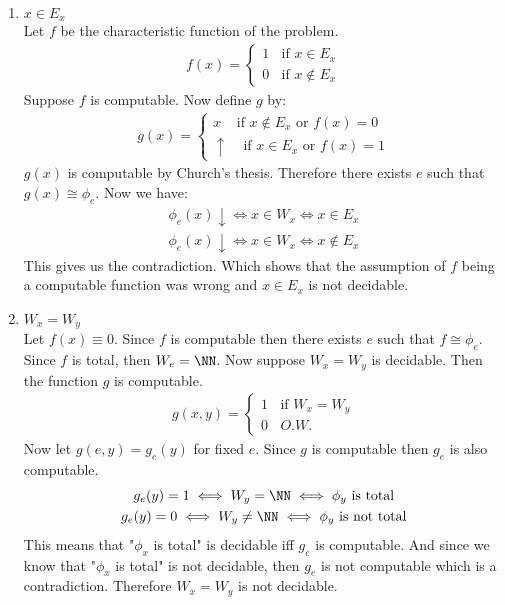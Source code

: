 \begin{enumerate}[label=\arabic*.]
    \item \textbf{$x \in E_x$} \\
        Let $f$ be the characteristic function of the problem.
        \begin{gather*}
            f(x) = \begin{cases}
                1 \ \ \ \ \text{if } x \in E_x \\
                0 \ \ \ \ \text{if } x \notin E_x
            \end{cases}
        \end{gather*}
        Suppose $f$ is computable. Now define $g$ by:
        \begin{gather*}
            g(x) = \begin{cases}
                x \ \ \ \ \ \text{if } x \notin E_x \text{ or } f(x) = 0 \\
                \uparrow \ \ \ \ \ \text{if } x \in E_x \text{ or } f(x) = 1
            \end{cases}
        \end{gather*}
        $g(x)$ is computable by Church's thesis. Therefore there exists $e$ such that $g(x) \cong \phi_e$. Now we have:
        \begin{gather*}
            \phi_e(x) \downarrow \iff x \in W_x \iff x \in E_x \\
            \phi_e(x) \downarrow \iff x \in W_x \iff x \notin E_x
        \end{gather*}
        This gives us the contradiction. Which shows that the assumption of $f$ being a computable function was wrong and $x \in E_x$ is not decidable.
    \item \textbf{$W_x = W_y$} \\
        Let $f(x) \equiv 0$. Since $f$ is computable then there exists $e$ such that $f \cong \phi_e$. Since $f$ is total, then $W_e = \NN$. Now suppose $W_x = W_y$ is decidable. Then the function $g$ is computable. 
        \begin{gather*}
            g(x, y) = \begin{cases}
                1 \ \ \ \ \text{if } W_x = W_y \\
                0 \ \ \ \ O.W.
            \end{cases}
        \end{gather*}
        Now let $g(e, y) = g_e(y)$ for fixed $e$. Since $g$ is computable then $g_e$ is also computable.
        \begin{gather*}
            g_e(y) = 1 \iff W_y = \NN \iff \phi_y \text{ is total} \\
            g_e(y) = 0 \iff W_y \ne \NN \iff \phi_y \text{ is not total}
        \end{gather*} 
        This means that "$\phi_x$ is total" is decidable iff $g_e$ is computable. And since we know that "$\phi_x$ is total" is not decidable, then $g_e$ is not computable which is a contradiction. Therefore $W_x = W_y$ is not decidable. 
    

\end{enumerate}

